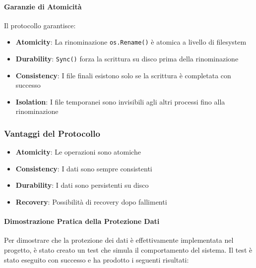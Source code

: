 \documentclass[12pt,a4paper]{article}
\begin{document}
\paragraph{Garanzie di Atomicità}

Il protocollo garantisce:

\begin{itemize}
\item \textbf{Atomicity}: La rinominazione \texttt{os.Rename()} è atomica a livello di filesystem
\item \textbf{Durability}: \texttt{Sync()} forza la scrittura su disco prima della rinominazione
\item \textbf{Consistency}: I file finali esistono solo se la scrittura è completata con successo
\item \textbf{Isolation}: I file temporanei sono invisibili agli altri processi fino alla rinominazione
\end{itemize}

\subsubsection{Vantaggi del Protocollo}

\begin{itemize}
\item \textbf{Atomicity}: Le operazioni sono atomiche
\item \textbf{Consistency}: I dati sono sempre consistenti
\item \textbf{Durability}: I dati sono persistenti su disco
\item \textbf{Recovery}: Possibilità di recovery dopo fallimenti
\end{itemize}

\paragraph{Dimostrazione Pratica della Protezione Dati}

Per dimostrare che la protezione dei dati è effettivamente implementata nel progetto, è stato creato un test che simula il comportamento del sistema. Il test è stato eseguito con successo e ha prodotto i seguenti risultati:
\end{document}
